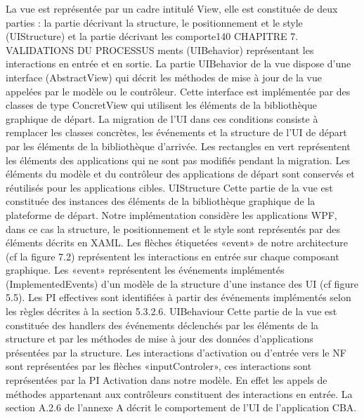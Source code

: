 \documentclass{article}
\begin{document}
La vue est repr\'{e}sent\'{e}e par un cadre intitul\'{e} View, elle est constitu\'{e}e de deux parties : la partie
d\'{e}crivant la structure, le positionnement et le style (UIStructure) et la partie d\'{e}crivant les comporte140
CHAPITRE 7. VALIDATIONS DU PROCESSUS
ments (UIBehavior) repr\'{e}sentant les interactions en entr\'{e}e et en sortie. La partie UIBehavior de la vue
dispose d’une interface (AbstractView) qui d\'{e}crit les m\'{e}thodes de mise \`{a} jour de la vue appel\'{e}es par
le mod\`{e}le ou le contr\^{o}leur. Cette interface est impl\'{e}ment\'{e}e par des classes de type ConcretView qui
utilisent les \'{e}l\'{e}ments de la biblioth\`{e}que graphique de d\'{e}part. La migration de l’UI dans ces conditions
consiste \`{a} remplacer les classes concr\`{e}tes, les \'{e}v\'{e}nements et la structure de l’UI de d\'{e}part par les
\'{e}l\'{e}ments de la biblioth\`{e}que d’arriv\'{e}e.
Les rectangles en vert repr\'{e}sentent les \'{e}l\'{e}ments des applications qui ne sont pas modiﬁ\'{e}s pendant
la migration. Les \'{e}l\'{e}ments du mod\`{e}le et du contr\^{o}leur des applications de d\'{e}part sont conserv\'{e}s et
r\'{e}utilis\'{e}s pour les applications cibles.
UIStructure
Cette partie de la vue est constitu\'{e}e des instances des \'{e}l\'{e}ments de la biblioth\`{e}que
graphique de la plateforme de d\'{e}part. Notre impl\'{e}mentation consid\`{e}re les applications WPF, dans ce
cas la structure, le positionnement et le style sont repr\'{e}sent\'{e}s par des \'{e}l\'{e}ments d\'{e}crits en XAML.
Les ﬂ\`{e}ches \'{e}tiquet\'{e}es «event» de notre architecture (cf la ﬁgure 7.2) repr\'{e}sentent les interactions
en entr\'{e}e sur chaque composant graphique. Les «event» repr\'{e}sentent les \'{e}v\'{e}nements impl\'{e}ment\'{e}s
(ImplementedEvents) d’un mod\`{e}le de la structure d’une instance des UI (cf ﬁgure 5.5). Les PI effectives sont identiﬁ\'{e}es \`{a} partir des \'{e}v\'{e}nements impl\'{e}ment\'{e}s selon les r\`{e}gles d\'{e}crites \`{a} la section 5.3.2.6.
UIBehaviour
Cette partie de la vue est constitu\'{e}e des handlers des \'{e}v\'{e}nements d\'{e}clench\'{e}s par les
\'{e}l\'{e}ments de la structure et par les m\'{e}thodes de mise \`{a} jour des donn\'{e}es d’applications pr\'{e}sent\'{e}es
par la structure. Les interactions d’activation ou d’entr\'{e}e vers le NF sont repr\'{e}sent\'{e}es par les ﬂ\`{e}ches
«inputControler», ces interactions sont repr\'{e}sent\'{e}es par la PI Activation dans notre mod\`{e}le. En effet
les appels de m\'{e}thodes appartenant aux contr\^{o}leurs constituent des interactions en entr\'{e}e. La section A.2.6 de l’annexe A d\'{e}crit le comportement de l’UI de l’application CBA.
\end{document}
